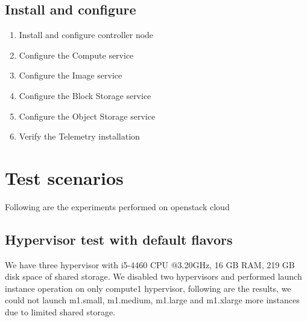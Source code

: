     \subsection{Install and configure}
    \begin{enumerate}
        \item Install and configure controller node
        \item Configure the Compute service
        \item Configure the Image service
        \item Configure the Block Storage service
        \item Configure the Object Storage service
        \item Verify the Telemetry installation
    \end{enumerate}

    \section{Test scenarios}
    \par Following are the experiments performed on openstack cloud
        \subsection{Hypervisor test with default flavors}
        \par We have three hypervisor with i5-4460 CPU @3.20GHz, 16 GB RAM, 219 GB disk space of shared storage. We disabled two hypervisors and performed launch instance operation on only compute1 hypervisor, following are the results, we could not launch m1.small, m1.medium, m1.large and m1.xlarge more instances due to limited shared storage.
        

